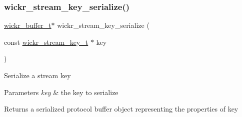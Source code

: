 \subsubsection{\texorpdfstring{wickr\_stream\_key\_serialize()}{wickr\_stream\_key\_serialize()}}
{\footnotesize\ttfamily \mbox{\hyperlink{structwickr__buffer}{wickr\+\_\+buffer\+\_\+t}}$\ast$ wickr\+\_\+stream\+\_\+key\+\_\+serialize (\begin{DoxyParamCaption}\item[{const \mbox{\hyperlink{structwickr__stream__key}{wickr\+\_\+stream\+\_\+key\+\_\+t}} $\ast$}]{key }\end{DoxyParamCaption})}

Serialize a stream key


\begin{DoxyParams}{Parameters}
{\em key} & the key to serialize \\
\hline
\end{DoxyParams}
\begin{DoxyReturn}{Returns}
a serialized protocol buffer object representing the properties of \textquotesingle{}key\textquotesingle{} 
\end{DoxyReturn}
